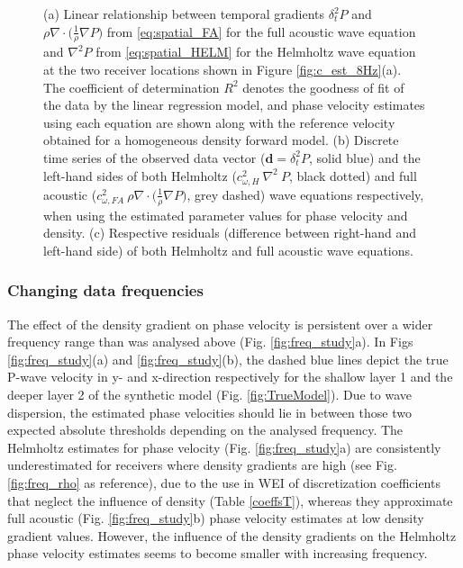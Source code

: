 \documentclass{article}
\begin{document}
\begin{figure}[H]
	\caption{(a) Linear relationship between temporal gradients $\delta_{t}^{2}P$ and $\rho \nabla \cdot \big(\frac{1}{\rho} \nabla P\big)$ from \eqref{eq:spatial_FA} for the full acoustic wave equation and $\nabla^{2} P$ from \eqref{eq:spatial_HELM} for the Helmholtz wave equation at the two receiver locations shown in Figure \ref{fig:c_est_8Hz}(a). The coefficient of determination $R^{2}$ denotes the goodness of fit of the data by the linear regression model, and phase velocity estimates using each equation are shown along with the reference velocity obtained for a homogeneous density forward model. (b) Discrete time series of the observed data vector ($\bm{d} = \delta_{t}^{2}P$, solid blue) and the left-hand sides of both Helmholtz ($c_{\omega,H}^{2} \: \nabla^{2} \:P$, black dotted) and full acoustic ($c_{\omega,FA}^{2} \:  \rho \nabla \cdot \big(\frac{1}{\rho} \nabla P\big)$, grey dashed) wave equations respectively, when using the estimated parameter values for phase velocity and density. (c) Respective residuals (difference between right-hand and left-hand side) of both Helmholtz and full acoustic wave equations.}\label{fig:misfit}
	\end{figure} %
	
	
	\subsubsection*{Changing data frequencies} \label{sec:freqs}
	
	The effect of the density gradient on phase velocity is persistent over a wider frequency range than was analysed above (Fig. \ref{fig:freq_study}a). In Figs \ref{fig:freq_study}(a) and \ref{fig:freq_study}(b), the dashed blue lines depict the true P-wave velocity in y- and x-direction respectively for the shallow layer 1 and the deeper layer 2 of the synthetic model (Fig. \ref{fig:TrueModel}). Due to wave dispersion, the estimated phase velocities should lie in between those two expected absolute thresholds depending on the analysed frequency. The Helmholtz estimates for phase velocity (Fig. \ref{fig:freq_study}a) are consistently underestimated for receivers where density gradients are high (see Fig. \ref{fig:freq_rho} as reference), due to the use in WEI of discretization coefficients that neglect the influence of density (Table \ref{coeffsT}),  whereas they approximate full acoustic (Fig. \ref{fig:freq_study}b) phase velocity estimates at low density gradient values. However, the influence of the density gradients on the Helmholtz phase velocity estimates seems to become smaller with increasing frequency.
	
\end{document}
